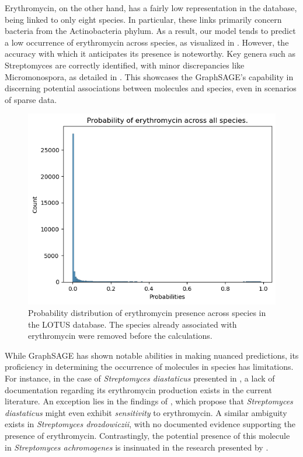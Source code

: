 \documentclass[
11pt, %
oneside, %
english, %
singlespacing, %
headsepline, %
chapterinoneline, %
]{MastersDoctoralThesis} %
\begin{document}
Erythromycin, on the other hand, has a fairly low representation in the database, being linked to only eight species. In particular, these links primarily concern bacteria from the Actinobacteria phylum. As a result, our model tends to predict a low occurrence of erythromycin across species, as visualized in . However, the accuracy with which it anticipates its presence is noteworthy. Key genera such as Streptomyces are correctly identified, with minor discrepancies like Micromonospora, as detailed in . This showcases the GraphSAGE's capability in discerning potential associations between molecules and species, even in scenarios of sparse data. 

\begin{figure}[h]
	\centering
	\includegraphics[scale=0.7]{figure/erythromycin}
	\caption{Probability distribution of erythromycin presence across species in the LOTUS database. The species already associated with erythromycin were removed before the calculations.}
	\label{fig: hist erythromycin}
\end{figure}

While GraphSAGE has shown notable abilities in making nuanced predictions, its proficiency in determining the occurrence of molecules in species has limitations. For instance, in the case of \textit{Streptomyces diastaticus} presented in , a lack of documentation regarding its erythromycin production exists in the current literature. An exception lies in the findings of \cite{graham23SRibosomalRibonucleic1979}, which propose that \textit{Streptomyces diastaticus} might even exhibit \textit{sensitivity} to erythromycin. A similar ambiguity exists in \textit{Streptomyces drozdowiczii}, with no documented evidence supporting the presence of erythromycin. Contrastingly, the potential presence of this molecule in \textit{Streptomyces achromogenes} is insinuated in the research presented by \cite{moosawiComputationalPredictionProperties2010}.
\end{document}
